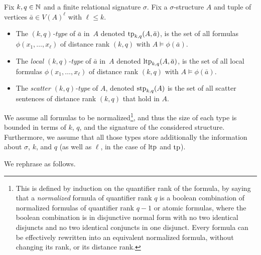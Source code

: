 Fix $k,q\in\mathbb N$ and a finite relational signature $\sigma$.
Fix a $\sigma$-structure \(A\) and tuple of vertices \(\bar a\in V(A)^\ell\) with $\ell\le k$.
\begin{itemize}
    \item The  \emph{$(k,q)$-type}
of \(\bar a\) in~\(A\)
denoted \(\textnormal{tp}_{k,q}(A,\bar a)\), is the set of all \distFO formulas \(\phi(x_1,\ldots,x_\ell)\) of distance rank \((k,q)\)
with \(A \models \phi(\bar a)\).
\item
The \emph{local $(k,q)$-type}
of \(\bar a\) in~\(A\)
denoted \(\textnormal{ltp}_{k,q}(A,\bar a)\), is the set of all local \distFO formulas \(\phi(x_1,\ldots,x_\ell)\) of distance rank \((k,q)\)
with \(A \models \phi(\bar a)\).
\item
The \emph{scatter \((k,q)\)-type} of \(A\), denoted \(\textnormal{stp}_{k,q}(A)\) is the set of all scatter sentences of distance rank \((k,q)\) that hold in \(A\).
\end{itemize}
We assume all formulas to be normalized\footnote{This is defined by induction on the quantifier rank of the formula, by saying that a \emph{normalized} formula of quantifier rank $q$ is a boolean combination of normalized formulas of quantifier rank $q-1$ or atomic formulas, where the boolean combination is in disjunctive normal form with no two identical disjuncts and no two identical conjuncts in one disjunct. Every \distFO formula can be effectively rewritten into an equivalent normalized formula, without changing its rank, or its distance rank.}, and thus the size of each type is bounded in terms of \(k\), \(q\), and the signature of the considered structure.
Furthermore, we assume that all those types store additionally the information about $\sigma$, $k$, and $q$
(as well as $\ell$, in the case of $\textnormal{ltp}$ and $\textnormal{tp}$).

We rephrase  as follows.

